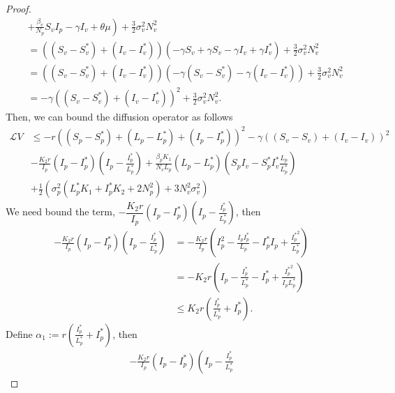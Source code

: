 \begin{proof}
\begin{align*}
			&+
				\left.
					\frac{\beta_v}{N_p}
					S_v I_p - 
					\gamma I_v + 
					\theta \mu 
				\right) + 
				\frac{3}{2}
				\sigma_v ^ 2 N_v ^ 2
				\\
			&=
				\left(
					(S_v - S_v^*) + 
					(I_v - I_v^*)
				\right)
				(-\gamma S_v + \gamma S_v - \gamma I_v + \gamma I_v^*) + 
				\frac{3}{2}
				\sigma_v ^ 2 N_v ^ 2
			\\
			&=
				\left(
					(S_v - S_v ^*) + 
					(I_v - I_v ^*)
				\right)
				\left(
					-\gamma (S_v - S_v^*)
					-\gamma (I_v - I_v^*)
				\right) + 
				\frac{3}{2}
				\sigma_v ^ 2 N_v ^ 2
				\\
			&=
				-\gamma 
				\left(
					(S_v - S_v ^*) + 
					(I_v - I_v^*)
				\right) ^2 + 
				\frac{3}{2}
				\sigma_v ^2 N_v^2.
	\end{align*}
	Then, we can bound the diffusion operator as follows
	\begin{align*}
		\mathcal{L}V 
			&\leq 
				-r 
				\left(
					(S_p - S_p ^*) + 
					(L_p - L_p ^*) +
					(I_p - I_p ^*)
				\right) ^2 - 
				\gamma 
				\left(
					(S_v - S_v) + 
					(I_v - I_v)
				\right) ^ 2
			\\
			&
				-\frac{K_2 r}{I_p} (I_p - I_p ^*)
				\left(
					I_p - 
					\frac{I_p^*}{L_p^*}
				\right) + 
				\frac{\beta_p K_1}{N_vL_p}
				(L_p - L_p ^*)
				\left(
					S_pI_v - S_p ^* I_v^*
					\frac{L_p}{L_p^*}
				\right)
			\\
			&+
				\frac{1}{2}
				\left(
					\sigma_p^2
					(L_p ^* K_1 + I_p ^* K_2 + 2N_p ^ 2) + 
					3 N_v ^ 2 
					\sigma_v ^ 2
				\right)
	\end{align*}
%
	We need bound the term,
	$
		-\dfrac{K_2r}{I_p} (I_p-I_p^*)
		\left(
			I_p - \frac{I_p^*}{L_p^*}
		\right)
	$, 
	then
	\begin{align*}
		-\frac{K_2r}{I_p}
		(I_p - I_p ^*)
		\left(
			I_p - \frac{I_p^*}{L_p^*}
		\right)
			&=
				-\frac{K_2 r}{I_p}
				\left(
					I_p^2 - 
					\frac{I_pI_p^*}{L_p} - I_p^*I_p + 
					\frac{{I_p ^*}^2}{L_p^*}
				\right)
			\\
			&= 
				-K_2r
				\left(
					I_p - 
					\frac{I_p^*}{L_p^*} - 
					I_p ^* +
					\frac{{I_p^*}^2}{I_pL_p^*}
				\right)
			\\
			&\leq
				K_2 r 
				\left(
					\frac{I_p^*}{L_p^*} + I_p^*
				\right).
	\end{align*}
%
	Define $\alpha_1 := r\left(\frac{I_p^*}{L_p^*}+I_p^*\right)$, then
	\begin{align*}
		-\frac{K_2r}{I_p}
		(I_p - I_p ^*)
		\left(
			I_p - \frac{I_p ^*}{L_p ^*}

\end{align*}
\end{proof}
